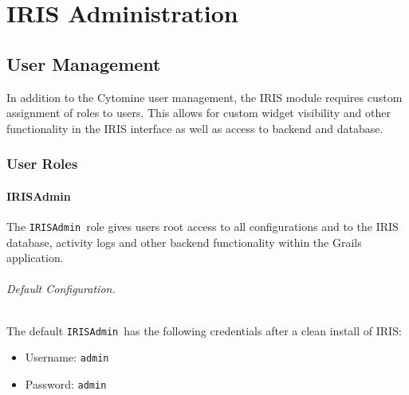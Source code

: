 \part{IRIS Administration}
\label{part:irisadmin}
{
\hypersetup{linkcolor=black}
\parttoc
}

\chapter{User Management}
In addition to the Cytomine user management, the IRIS module requires custom assignment of roles to users. 
This allows for custom widget visibility and other functionality in the IRIS interface as well as access to backend and database. 

\def\irisadmin{\texttt{IRISAdmin}}
\def\pjcoord{\texttt{ProjectCoordinator}}
\section{User Roles}
\subsection{IRISAdmin}
The \irisadmin\ role gives users root access to all configurations and to the IRIS database, activity logs and other backend functionality within the Grails application.  

\noindent 

\paragraph{Default Configuration.} 
The default \irisadmin\ has the following credentials after a clean install of IRIS:
\begin{itemize}
\item Username: \texttt{admin}
\item Password: \texttt{admin}
\end{itemize}


